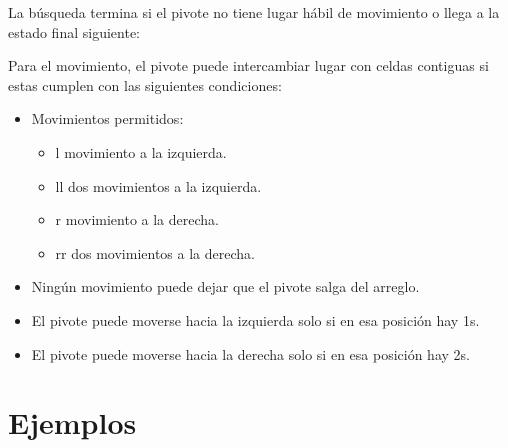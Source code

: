 \documentclass[letterpaper]{article}
\begin{document}

La búsqueda termina si el pivote no tiene lugar hábil de movimiento o llega a la
estado final siguiente:


Para el movimiento, el pivote puede intercambiar lugar con celdas contiguas si estas
cumplen con las siguientes condiciones:

\begin{itemize}
    \item Movimientos permitidos:
        \begin{itemize}
            \item l movimiento a la izquierda.
            \item ll dos movimientos a la izquierda.
            \item r movimiento a la derecha.
            \item rr dos movimientos a la derecha.
        \end{itemize}
    \item Ningún movimiento puede dejar que el pivote salga del arreglo.
    \item El pivote puede moverse hacia la izquierda solo si en esa posición hay 1s.
    \item El pivote puede moverse hacia la derecha solo si en esa posición hay 2s.
\end{itemize}

\section{Ejemplos}

\end{document}
